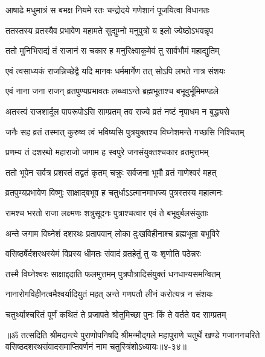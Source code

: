\twolineshloka
{आषाढे मधुमात्रं स बभक्ष नियमे रतः}
{चन्द्रोदये गणेशानं पूजयित्वा विधानतः} %

\twolineshloka
{ततस्तस्य व्रतस्यैव प्रभावेण महामते}
{सुद्युम्नो मनुपुत्रो य इलो ज्येष्ठोऽभवन्नृप} %

\twolineshloka
{ततो मुनिभिराद्यं तं राजानं स चकार ह}
{मनुरिक्ष्वाकुमेवं तु सार्वभौमं महाद्युतिम्} %

\twolineshloka
{एवं त्वसाध्यकं राजन्निच्छेद्वै यदि मानवः}
{धर्ममार्गेण तत् सोऽपि लभते नात्र संशयः} %

\twolineshloka
{एवं नाना जना राजन् व्रतपुण्यप्रभावतः}
{लब्ध्वाऽन्ते ब्रह्मभूताश्च बभूवुर्भूमिमण्डले} %

\twolineshloka
{अतस्त्वं राजशार्दूल पापरूपोऽसि साम्प्रतम्}
{तव राज्ये व्रतं नष्टं नृपाधम न बुद्ध्यसे} %

\twolineshloka
{जनैः सह व्रतं तस्मात् कुरुष्व त्वं भविष्यसि}
{पुत्रयुक्तश्च विघ्नेशमन्ते गच्छसि निश्चितम्} %


\twolineshloka
{प्रणम्य तं दशरथो महाराजो जगाम ह}
{स्वपुरे जनसंयुक्तश्चकार व्रतमुत्तमम्} %

\twolineshloka
{ततो भूपेन सर्वत्र प्रशस्तं तद्व्रतं कृतम्}
{चक्रुः सर्वजना भूमौ व्रतं गाणेश्वरं महत्} %

\twolineshloka
{व्रतपुण्यप्रभावेण विष्णुः साक्षाद्बभूव ह}
{चतुर्धाऽऽत्मानमाभज्य पुत्रस्तस्य महात्मनः} %

\twolineshloka
{रामश्च भरतो राजा लक्ष्मणः शत्रुसूदनः}
{पुत्राश्चत्वार एवं ते बभूवुर्बलसंयुताः} %

\twolineshloka
{अन्ते जगाम विघ्नेशं दशरथः प्रतापवान्}
{लोका दुःखविहीनाश्च ब्रह्मभूता बभूविरे} %

\twolineshloka
{वसिष्ठर्षेर्दशरथस्येमं विप्रस्य धीमतः}
{संवादं व्रतहेतुं तु यः श‍ृणोति पठेन्नरः} %

\twolineshloka
{तस्मै विघ्नेश्वरः साक्षाद्ददाति फलमुत्तमम्}
{पुत्रपौत्रादिसंयुक्तं धनधान्यसमन्वितम्} %

\twolineshloka
{नानारोगविहीनत्वमैश्वर्यादियुतं महत्}
{अन्ते गणपतौ लीनं करोत्यत्र न संशयः} %

\twolineshloka
{चतुर्थ्याश्चरितं पूर्णं कथितं ते प्रजापते}
{श्रोतुमिच्छा पुनः किं ते वर्तते वद साम्प्रतम्} %

॥ॐ तत्सदिति श्रीमदान्त्ये पुराणोपनिषदि श्रीमन्मौद्गले महापुराणे चतुर्थे खण्डे गजाननचरिते वसिष्ठदशरथसंवादसमाप्तिवर्णनं नाम चतुस्त्रिंशोऽध्यायः॥४-३४॥


\label{sec:chaturthyudyapana-nirupanam}

